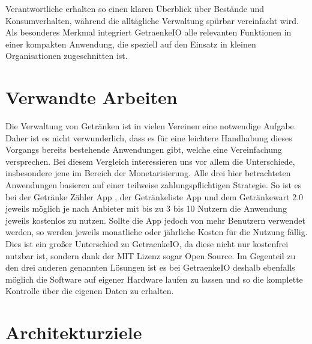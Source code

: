 \documentclass[conference,a4paper]{cs-techrep}
\begin{document}
Verantwortliche erhalten so einen klaren Überblick über Bestände und Konsumverhalten, während die alltägliche Verwaltung spürbar vereinfacht wird. Als besonderes Merkmal integriert GetraenkeIO alle relevanten Funktionen in einer kompakten Anwendung, die speziell auf den Einsatz in kleinen Organisationen zugeschnitten ist.

\section{Verwandte Arbeiten}
Die Verwaltung von Getränken ist in vielen Vereinen eine notwendige Aufgabe. Daher ist es nicht verwunderlich, dass es für eine leichtere Handhabung dieses Vorgangs bereits bestehende Anwendungen gibt, welche eine Vereinfachung versprechen. Bei diesem Vergleich interessieren uns vor allem die Unterschiede, insbesondere jene im Bereich der Monetarisierung.
Alle drei hier betrachteten Anwendungen basieren auf einer teilweise zahlungspflichtigen Strategie. So ist es bei der Getränke Zähler App \cite{drinkscounter}, der Getränkeliste App \cite{getraenkelisteapp} und dem Getränkewart 2.0 \cite{getraenkewart} jeweils möglich je nach Anbieter mit bis zu 3 bis 10 Nutzern die Anwendung jeweils kostenlos zu nutzen. Sollte die App jedoch von mehr Benutzern verwendet werden, so werden jeweils monatliche oder jährliche Kosten für die Nutzung fällig. Dies ist ein großer Unterschied zu GetraenkeIO, da diese nicht nur kostenfrei nutzbar ist, sondern dank der MIT Lizenz sogar Open Source. Im Gegenteil zu den drei anderen genannten Lösungen ist es bei GetraenkeIO deshalb ebenfalls möglich die Software auf eigener Hardware laufen zu lassen und so die komplette Kontrolle über die eigenen Daten zu erhalten.

\section{Architekturziele} %
\end{document}
